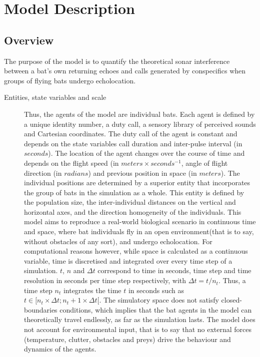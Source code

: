 \documentclass[12pt]{article}
\begin{document}
\section{Model Description}

\subsection{Overview}
\label{sec:ovv}

The purpose of the model is to quantify the theoretical sonar interference between a bat's own returning echoes and calls generated by conspecifics when groups of flying bats undergo echolocation.
 
\begin{description}

\item [Entities, state variables and scale] Thus, the agents of the model are individual bats. Each agent is defined by a unique identity number, a duty call, a sensory library of perceived sounds and Cartesian coordinates. The duty call of the agent is constant and depends on the state variables call duration and inter-pulse interval (in $seconds$). The location of the agent changes over the course of time and depends on the flight speed (in $meters\times seconds^{-1}$, angle of flight direction (in $radians$) and previous position in space (in $meters$). The individual positions are determined by a superior entity that incorporates the group of bats in the simulation as a whole. This entity is defined by the population size, the inter-individual distances on the vertical and horizontal axes, and the direction homogeneity of the individuals.
This model aims to reproduce a real-world biological scenario in continuous time and space, where  bat individuals fly in an open environment(that is to say, without obstacles of any sort), and undergo echolocation. For computational reasons however, while space is calculated as a continuous variable, time is discretised and integrated over every time step of a simulation.
$t$, $n$ and $\Delta t$ correspond to time in seconds, time step and time resolution in seconds per time step respectively, with $\Delta t=t/n_t$. Thus, a time step $n_t$ integrates the time $t$ in seconds such as $t\in [n_t\times\Delta t;n_t+1\times\Delta t[$. The simulatory space does not satisfy closed-boundaries conditions, which implies that the bat agents in the model can theoretically travel endlessly, as far as the simulation lasts.
The model does not account for environmental input, that is to say that no external forces (temperature, clutter, obstacles and preys) drive the behaviour and dynamics of the agents.


\end{description}
\end{document}
